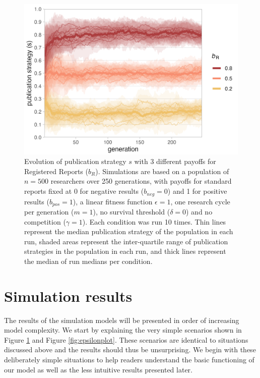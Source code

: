 \documentclass[
  ,man,mask,floatsintext]{apa6}
\begin{document}
\begin{figure}

{\centering \includegraphics[width=5.04in]{../plots/plot_evo} 

}

\caption{Evolution of publication strategy \(s\) with 3 different payoffs for Registered Reports (\(b_{R}\)). Simulations are based on a population of \(n = 500\) researchers over 250 generations, with payoffs for standard reports fixed at 0 for negative results (\(b_{neg} = 0\)) and 1 for positive results (\(b_{pos} = 1\)), a linear fitness function \(\epsilon = 1\), one research cycle per generation (\(m = 1\)), no survival threshold (\(\delta = 0\)) and no competition (\(\gamma = 1\)). Each condition was run 10 times. Thin lines represent the median publication strategy of the population in each run, shaded areas represent the inter-quartile range of publication strategies in the population in each run, and thick lines represent the median of run medians per condition.}\label{fig:evoplot}
\end{figure}

\hypertarget{simulation-results}{%
\section{Simulation results}\label{simulation-results}}

The results of the simulation models will be presented in order of increasing model complexity.
We start by explaining the very simple scenarios shown in Figure \ref{fig:evoplot} and Figure \ref{fig:epsilonplot}.
These scenarios are identical to situations discussed above and the results should thus be unsurprising.
We begin with these deliberately simple situations to help
readers understand the basic functioning of our model as well as the less intuitive results presented later.
\end{document}
